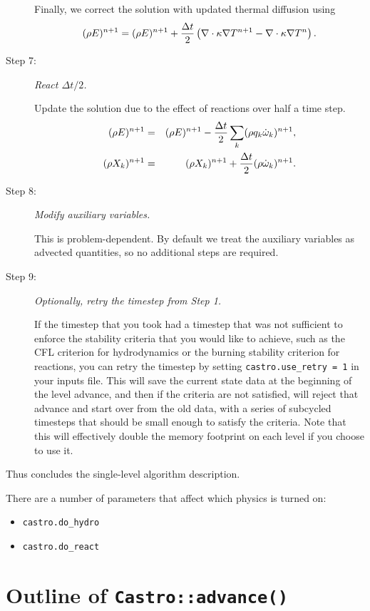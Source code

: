 \begin{description}
Finally, we correct the solution with updated thermal diffusion using
\begin{equation}
(\rho E)^{n+1} = (\rho E)^{n+1} + \frac{\Delta t}{2}\left(\nabla\cdot\kappa\nabla T^{n+1} - \nabla\cdot\kappa\nabla T^n\right).
\end{equation}
\item[Step 7:] {\em React $\Delta t/2$.}

Update the solution due to the effect of reactions over half a time step.
\begin{eqnarray}
(\rho E)^{n+1} &=& (\rho E)^{n+1} - \frac{\Delta t}{2}\sum_k(\rho q_k\dot\omega_k)^{n+1},\\
(\rho X_k)^{n+1} &=& (\rho X_k)^{n+1} + \frac{\Delta t}{2}(\rho\dot\omega_k)^{n+1}.
\end{eqnarray}
\item[Step 8:] {\em Modify auxiliary variables.}

This is problem-dependent.  By default we treat the auxiliary
variables as advected quantities, so no additional steps are required.

\item[Step 9:] {\em Optionally, retry the timestep from Step 1.}

If the timestep that you took had a timestep that was not sufficient to
enforce the stability criteria that you would like to achieve, such as
the CFL criterion for hydrodynamics or the burning stability criterion
for reactions, you can retry the timestep by setting {\tt castro.use\_retry = 1}
in your inputs file. This will save the current state data at the beginning
of the level advance, and then if the criteria are not satisfied, will
reject that advance and start over from the old data, with a series of
subcycled timesteps that should be small enough to satisfy the criteria.
Note that this will effectively double the memory footprint on each level
if you choose to use it.

\end{description}
Thus concludes the single-level algorithm description.


There are a number of parameters that affect which physics is turned on:
\begin{itemize}
\item {\tt castro.do\_hydro}
\item {\tt castro.do\_react}
\end{itemize}


\section{Outline of {\tt Castro::advance()}}

